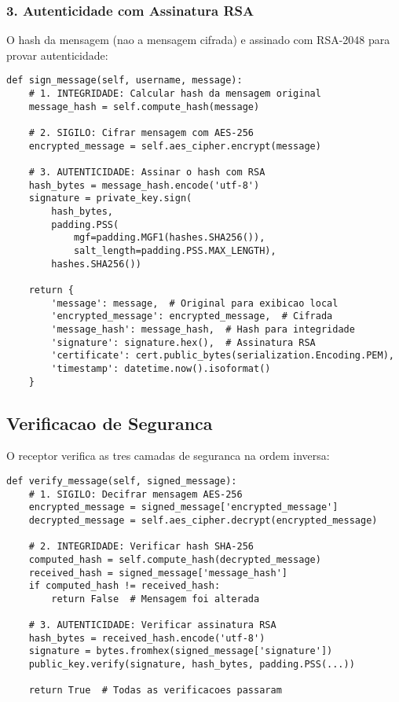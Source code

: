 \documentclass[12pt,a4paper,oneside]{article}
\begin{document}
\subsubsection{3. Autenticidade com Assinatura RSA}

O hash da mensagem (nao a mensagem cifrada) e assinado com RSA-2048 para provar autenticidade:

\begin{lstlisting}[caption=Assinatura digital RSA-PSS]
def sign_message(self, username, message):
    # 1. INTEGRIDADE: Calcular hash da mensagem original
    message_hash = self.compute_hash(message)
    
    # 2. SIGILO: Cifrar mensagem com AES-256
    encrypted_message = self.aes_cipher.encrypt(message)
    
    # 3. AUTENTICIDADE: Assinar o hash com RSA
    hash_bytes = message_hash.encode('utf-8')
    signature = private_key.sign(
        hash_bytes,
        padding.PSS(
            mgf=padding.MGF1(hashes.SHA256()),
            salt_length=padding.PSS.MAX_LENGTH),
        hashes.SHA256())
    
    return {
        'message': message,  # Original para exibicao local
        'encrypted_message': encrypted_message,  # Cifrada
        'message_hash': message_hash,  # Hash para integridade
        'signature': signature.hex(),  # Assinatura RSA
        'certificate': cert.public_bytes(serialization.Encoding.PEM),
        'timestamp': datetime.now().isoformat()
    }
\end{lstlisting}

\subsection{Verificacao de Seguranca}

O receptor verifica as tres camadas de seguranca na ordem inversa:

\begin{lstlisting}[caption=Verificacao da tripla seguranca]
def verify_message(self, signed_message):
    # 1. SIGILO: Decifrar mensagem AES-256
    encrypted_message = signed_message['encrypted_message']
    decrypted_message = self.aes_cipher.decrypt(encrypted_message)
    
    # 2. INTEGRIDADE: Verificar hash SHA-256
    computed_hash = self.compute_hash(decrypted_message)
    received_hash = signed_message['message_hash']
    if computed_hash != received_hash:
        return False  # Mensagem foi alterada
    
    # 3. AUTENTICIDADE: Verificar assinatura RSA
    hash_bytes = received_hash.encode('utf-8')
    signature = bytes.fromhex(signed_message['signature'])
    public_key.verify(signature, hash_bytes, padding.PSS(...))
    
    return True  # Todas as verificacoes passaram
\end{lstlisting}
\end{document}
